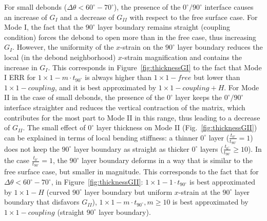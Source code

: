 \documentclass[Review,sagev,times]{sagej}
\begin{document}
For small debonds ($\Delta\theta<60^{\circ}-70^{\circ}$), the presence of the $0^{\circ}/90^{\circ}$ interface causes an increase of $G_{I}$ and a decrease of $G_{II}$ with respect to the free surface case. For Mode I, the fact that the $90^{\circ}$ layer boundary remains straight (coupling condition) forces the debond to open more than in the free case, thus increasing $G_{I}$. However, the uniformity of the $x$-strain on the $90^{\circ}$ layer boundary reduces the local (in the debond neighborhood) $x$-strain magnification and contains the increase in $G_{I}$. This corresponds in Figure~\ref{fig:thicknessGI} to the fact that Mode I ERR for $1\times1-m\cdot t_{90^{\circ}}$ is always higher than $1\times1-free$ but lower than $1\times1-coupling$, and it is best approximated by $1\times1-coupling+H$. For Mode II in the case of small debonds, the presence of the $0^{\circ}$ layer  keeps the $0^{\circ}/90^{\circ}$ interface straighter and reduces the vertical contraction of the matrix, which contributes for the most part to Mode II in this range, thus leading to a decrease of $G_{II}$. The small effect of $0^{\circ}$ layer thickness on Mode II (Fig.~\ref{fig:thicknessGII}) can be explained in terms of local bending stiffness: a thinner $0^{\circ}$ layer ($\frac{t_{0^{\circ}}}{t_{90^{\circ}}}=1$) does not keep the $90^{\circ}$ layer boundary as straight as thicker $0^{\circ}$ layers ($\frac{t_{0^{\circ}}}{t_{90^{\circ}}}\geq10$). In the case $\frac{t_{0^{\circ}}}{t_{90^{\circ}}}=1$, the $90^{\circ}$ layer boundary deforms in a way that is similar to the free surface case, but smaller in magnitude. This corresponds to the fact that for $\Delta\theta<60^{\circ}-70^{\circ}$, in Figure~\ref{fig:thicknessGII}: $1\times1-1\cdot t_{90^{\circ}}$ is best approximated by $1\times1-H$ (curved $90^{\circ}$ layer boundary but uniform $x$-strain at the $90^{\circ}$ layer boundary that disfavors $G_{II}$), $1\times1-m\cdot t_{90^{\circ}},m\geq10$ is best approximated by $1\times1-coupling$ (straight $90^{\circ}$ layer boundary).\\
\end{document}
